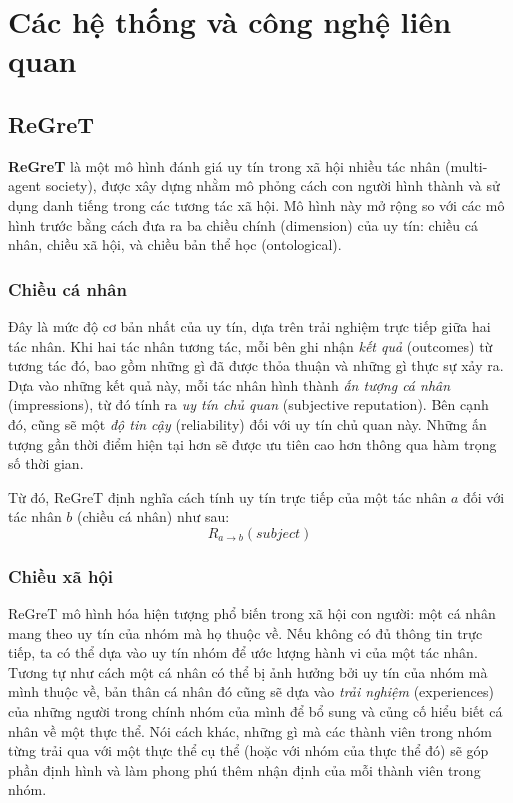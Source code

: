 \chapter{Các hệ thống và công nghệ liên quan}

\section{ReGreT}

\textbf{ReGreT} \cite{regret-reputation-system} là một mô hình đánh giá uy tín trong xã hội nhiều tác nhân (multi-agent society), được xây dựng nhằm mô phỏng cách con người hình thành và sử dụng danh tiếng trong các tương tác xã hội.
Mô hình này mở rộng so với các mô hình trước bằng cách đưa ra ba chiều chính (dimension) của uy tín: chiều cá nhân, chiều xã hội, và chiều bản thể học (ontological).

\subsection{Chiều cá nhân}

Đây là mức độ cơ bản nhất của uy tín, dựa trên trải nghiệm trực tiếp giữa hai tác nhân. Khi hai tác nhân tương tác, mỗi bên ghi nhận \textit{kết quả} (outcomes) từ tương tác đó, bao gồm những gì đã được thỏa thuận và những gì thực sự xảy ra.
Dựa vào những kết quả này, mỗi tác nhân hình thành \textit{ấn tượng cá nhân} (impressions), từ đó tính ra \textit{uy tín chủ quan} (subjective reputation). Bên cạnh đó, cũng sẽ một
\textit{độ tin cậy} (reliability) đối với uy tín chủ quan này. Những ấn tượng gần thời điểm hiện tại hơn sẽ được ưu tiên cao hơn thông qua hàm trọng số thời gian.

Từ đó, ReGreT định nghĩa cách tính uy tín trực tiếp của một tác nhân $a$ đối với tác nhân $b$ (chiều cá nhân) như sau:
\[R_{a \rightarrow b}(subject)\]

\subsection{Chiều xã hội}

ReGreT mô hình hóa hiện tượng phổ biến trong xã hội con người: một cá nhân mang theo uy tín của nhóm mà họ thuộc về.
Nếu không có đủ thông tin trực tiếp, ta có thể dựa vào uy tín nhóm để ước lượng hành vi của một tác nhân.
Tương tự như cách một cá nhân có thể bị ảnh hưởng bởi uy tín của nhóm mà mình thuộc về, bản thân cá nhân đó cũng sẽ dựa vào \textit{trải nghiệm} (experiences)
của những người trong chính nhóm của mình để bổ sung và củng cố hiểu biết cá nhân về một thực thể.
Nói cách khác, những gì mà các thành viên trong nhóm từng trải qua với một thực thể cụ thể (hoặc với nhóm của thực thể đó) sẽ góp phần định hình
và làm phong phú thêm nhận định của mỗi thành viên trong nhóm.


